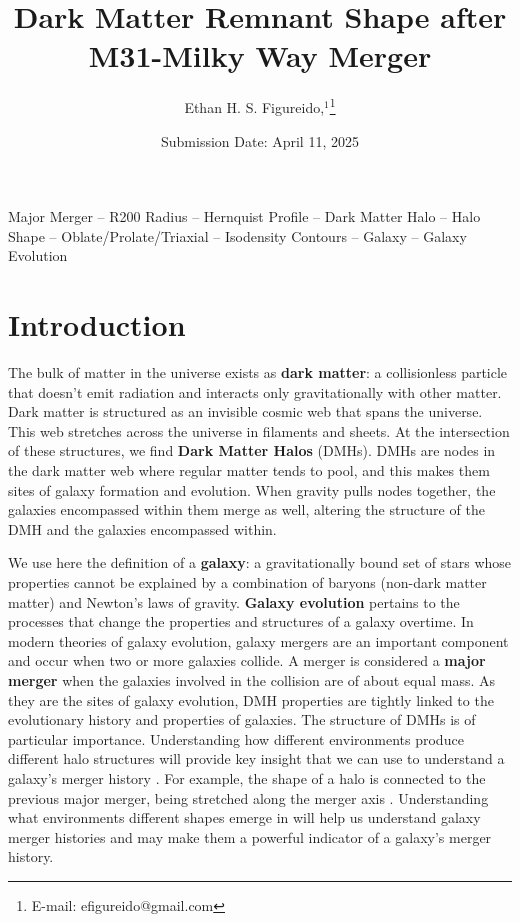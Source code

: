 \documentclass[fleqn,usenatbib]{mnras}
\title[Dark Matter Remnant Shape]{Dark Matter Remnant Shape after M31-Milky Way Merger}
\author[E. H. S. Figureido]{
Ethan H. S. Figureido,$^{1}$\thanks{E-mail: efigureido@gmail.com}}
\date{Submission Date: April 11, 2025}
\begin{document}
\label{firstpage}
\pagerange{\pageref{firstpage}--\pageref{lastpage}}
\maketitle


\begin{keywords}
Major Merger -- R200 Radius -- Hernquist Profile -- Dark Matter Halo -- Halo Shape -- Oblate/Prolate/Triaxial -- Isodensity Contours -- Galaxy -- Galaxy Evolution 
\end{keywords}



\section{Introduction}

The bulk of matter in the universe exists as \textbf{dark matter}: a collisionless particle that doesn’t emit radiation and interacts only gravitationally with other matter. Dark matter is structured as an invisible cosmic web that spans the universe. This web stretches across the universe in filaments and sheets. At the intersection of these structures, we find \textbf{Dark Matter Halos} (DMHs). DMHs are nodes in the dark matter web where regular matter tends to pool, and this makes them sites of galaxy formation and evolution. When gravity pulls nodes together, the galaxies encompassed within them merge as well, altering the structure of the DMH and the galaxies encompassed within.

We use here the \citet{Willman_2012} definition of a \textbf{galaxy}: a gravitationally bound set of stars whose properties cannot be explained by a combination of baryons (non-dark matter matter) and Newton’s laws of gravity. \textbf{Galaxy evolution} pertains to the processes that change the properties and structures of a galaxy overtime. In modern theories of galaxy evolution, galaxy mergers are an important component and occur when two or more galaxies collide. A merger is considered a \textbf{major merger} when the galaxies involved in the collision are of about equal mass. As they are the sites of galaxy evolution, DMH properties are tightly linked to the evolutionary history and properties of galaxies. The structure of DMHs is of particular importance. Understanding how different environments produce different halo structures will provide key insight that we can use to understand a galaxy’s merger history \citep{Drakos_2019}. For example, the shape of a halo is connected to the previous major merger, being stretched along the merger axis \citep{Despali_2016}. Understanding what environments different shapes emerge in will help us understand galaxy merger histories and may make them a powerful indicator of a galaxy's merger history.
\end{document}

